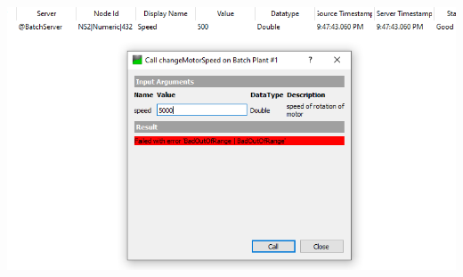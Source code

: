 \documentclass[12pt]{article}
\begin{document}
\vspace{2cm}
\begin{center}
	\includegraphics[scale=0.7]{figs/brzinaMotoraVanOpsega.PNG}
\end{center}
\end{document}
